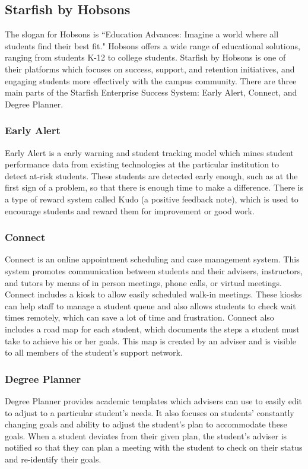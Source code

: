 \subsection{Starfish by Hobsons}
The slogan for Hobsons is ``Education Advances: Imagine a world where all students find their best fit." Hobsons offers a wide range of educational solutions, ranging from students K-12 to college students. Starfish by Hobsons is one of their platforms which focuses on success, support, and retention initiatives, and engaging students more effectively with the campus community. There are three main parts of the Starfish Enterprise Success System: Early Alert, Connect, and Degree Planner.
\subsubsection{Early Alert}
Early Alert is a early warning and student tracking model which mines student performance data from existing technologies at the particular institution to detect at-risk students. These students are detected early enough, such as at the first sign of a problem, so that there is enough time to make a difference. There is a type of reward system called Kudo (a positive feedback note), which is used to encourage students and reward them for improvement or good work. 
\subsubsection{Connect}
Connect is an online appointment scheduling and case management system. This system promotes communication between students and their advisers, instructors, and tutors by means of in person meetings, phone calls, or virtual meetings. Connect includes a kiosk to allow easily scheduled walk-in meetings. These kiosks can help staff to manage a student queue and also allows students to check wait times remotely, which can save a lot of time and frustration. Connect also includes a road map for each student, which documents the steps a student must take to achieve his or her goals. This map is created by an adviser and is visible to all members of the student's support network. 
\subsubsection{Degree Planner}
Degree Planner provides academic templates which advisers can use to easily edit to adjust to a particular student's needs. It also focuses on students' constantly changing goals and ability to adjust the student's plan to accommodate these goals. When a student deviates from their given plan, the student's adviser is notified so that they can plan a meeting with the student to check on their status and re-identify their goals. 

